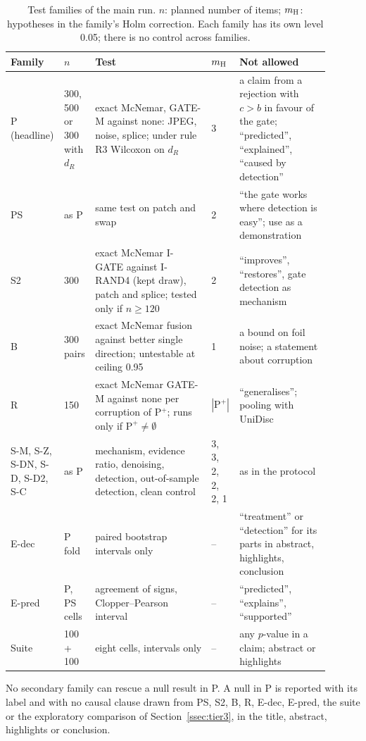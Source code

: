 \begin{table}[t]
\centering
\caption{Test families of the main run. $n$: planned number of items; $m_{\rm H}$: hypotheses in the family's Holm correction.
Each family has its own level 0.05; there is no control across families.}
\label{tab:families}
\footnotesize
\setlength{\tabcolsep}{3pt}
\begin{tabular}{p{0.12\linewidth}p{0.09\linewidth}p{0.36\linewidth}p{0.05\linewidth}p{0.28\linewidth}}
\toprule
Family & $n$ & Test & $m_{\rm H}$ & Not allowed \\
\midrule
P (headline) & 300, 500 or 300 with $d_R$ & exact McNemar, GATE-M against none: JPEG, noise, splice; under rule R3 Wilcoxon on $d_R$ & 3 & a claim from a rejection with $c>b$ in favour of the gate; ``predicted'', ``explained'', ``caused by detection'' \\
PS & as P & same test on patch and swap & 2 & ``the gate works where detection is easy''; use as a demonstration \\
S2 & 300 & exact McNemar I-GATE against I-RAND4 (kept draw), patch and splice; tested only if $n\ge120$ & 2 & ``improves'', ``restores'', gate detection as mechanism \\
B & 300 pairs & exact McNemar fusion against better single direction; untestable at ceiling 0.95 & 1 & a bound on foil noise; a statement about corruption \\
R & 150 & exact McNemar GATE-M against none per corruption of P$^+$; runs only if $\text{P}^+\neq\emptyset$ & $|\text{P}^+|$ & ``generalises''; pooling with UniDisc \\
S-M, S-Z, S-DN, S-D, S-D2, S-C & as P & mechanism, evidence ratio, denoising, detection, out-of-sample detection, clean control & 3, 3, 2, 2, 2, 1 & as in the protocol \\
\midrule
E-dec & P fold & paired bootstrap intervals only & -- & ``treatment'' or ``detection'' for its parts in abstract, highlights, conclusion \\
E-pred & P, PS cells & agreement of signs, Clopper--Pearson interval & -- & ``predicted'', ``explains'', ``supported'' \\
Suite & 100 + 100 & eight cells, intervals only & -- & any $p$-value in a claim; abstract or highlights \\
\bottomrule
\end{tabular}
\end{table}
No secondary family can rescue a null result in P.
A null in P is reported with its label and with no causal clause drawn from PS, S2, B, R, E-dec, E-pred, the suite or the
exploratory comparison of Section~\ref{ssec:tier3}, in the title, abstract, highlights or conclusion.

